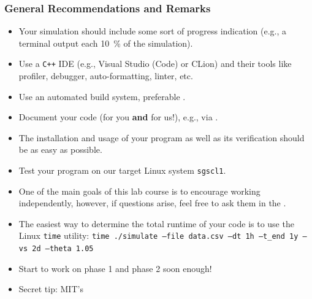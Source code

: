 \begin{frame}[fragile]
  \frametitle{General Recommendations and Remarks}
  \begin{itemize}
    \item Your simulation should include some sort of progress indication (e.g., a terminal output each \SI{10}{\percent} of the simulation).
    \item Use a \texttt{C++} IDE (e.g., Visual Studio (Code) or CLion) and their tools like profiler, debugger, auto-formatting, linter, etc.
    \item Use an automated build system, preferable .
    \item Document your code (for you \textbf{and} for us!), e.g., via .
    \item The installation and usage of your program as well as its verification should be as easy as possible.
    \item Test your program on our target Linux system \texttt{sgscl1}.
    \item One of the main goals of this lab course is to encourage working independently, however, if questions arise, feel free to ask them in the .
    \item The easiest way to determine the total runtime of your code is to use the Linux \texttt{time} utility: \texttt{time ./simulate --file data.csv --dt 1h --t_end 1y --vs 2d --theta 1.05}
    \item Start to work on phase 1 and phase 2 soon enough!
    \item Secret tip: MIT's 
  \end{itemize}
\end{frame}



